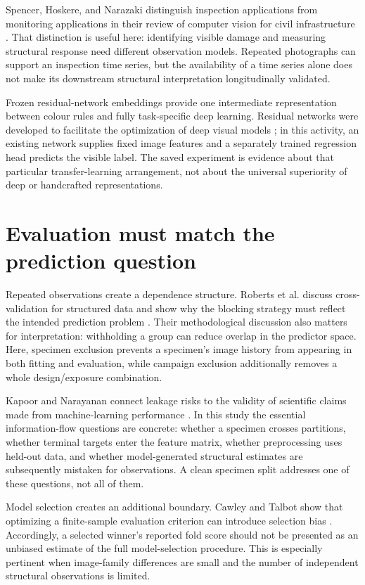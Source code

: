Spencer, Hoskere, and Narazaki distinguish inspection applications from monitoring applications in their review of computer vision for civil infrastructure \citep{spencer2019}. That distinction is useful here: identifying visible damage and measuring structural response need different observation models. Repeated photographs can support an inspection time series, but the availability of a time series alone does not make its downstream structural interpretation longitudinally validated.

Frozen residual-network embeddings provide one intermediate representation between colour rules and fully task-specific deep learning. Residual networks were developed to facilitate the optimization of deep visual models \citep{he2016}; in this activity, an existing network supplies fixed image features and a separately trained regression head predicts the visible label. The saved experiment is evidence about that particular transfer-learning arrangement, not about the universal superiority of deep or handcrafted representations.

\section{Evaluation must match the prediction question}
Repeated observations create a dependence structure. Roberts et al. discuss cross-validation for structured data and show why the blocking strategy must reflect the intended prediction problem \citep{roberts2017}. Their methodological discussion also matters for interpretation: withholding a group can reduce overlap in the predictor space. Here, specimen exclusion prevents a specimen's image history from appearing in both fitting and evaluation, while campaign exclusion additionally removes a whole design/exposure combination.

Kapoor and Narayanan connect leakage risks to the validity of scientific claims made from machine-learning performance \citep{kapoor2023}. In this study the essential information-flow questions are concrete: whether a specimen crosses partitions, whether terminal targets enter the feature matrix, whether preprocessing uses held-out data, and whether model-generated structural estimates are subsequently mistaken for observations. A clean specimen split addresses one of these questions, not all of them.

Model selection creates an additional boundary. Cawley and Talbot show that optimizing a finite-sample evaluation criterion can introduce selection bias \citep{cawley2010}. Accordingly, a selected winner's reported fold score should not be presented as an unbiased estimate of the full model-selection procedure. This is especially pertinent when image-family differences are small and the number of independent structural observations is limited.

